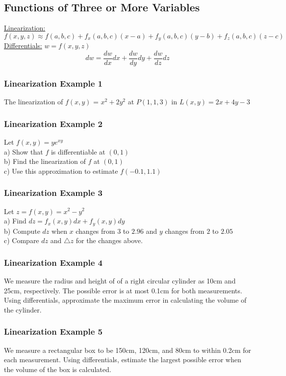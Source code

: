 \documentclass[12pt]{article}
\begin{document}
\subsection{Functions of Three or More Variables}
\underline{Linearization:}
\[
	f(x,y,z) \approx f(a,b,c) + f_x(a,b,c)(x-a) + f_y(a,b,c)(y-b) + f_z(a,b,c)(z-c)
\]
\underline{Differentials:} \(w=f(x,y,z)\) 
\[
	dw=\frac{dw}{dx}dx + \frac{dw}{dy}dy + \frac{dw}{dz}dz
\]
\subsubsection{Linearization Example 1}
The linearization of \(f(x,y)\) = \(x^2+2y^2\) at \(P(1,1,3)\) in \(L(x,y) = 2x+4y-3\) 

\subsubsection{Linearization Example 2}
Let \(f(x,y) = ye^{xy}\) \\
a) Show that \(f\) is differentiable at \((0,1)\) \\
b) Find the linearization of \(f\) at \((0,1)\) \\
c) Use this approximation to estimate \(f(-0.1,1.1)\) 

\subsubsection{Linearization Example 3}
Let \(z=f(x,y)=x^2-y^2\) \\
a) Find \(dz=f_x(x,y)dx+f_y(x,y)dy\)\\
b) Compute \(dz\) when \(x\) changes from \(3\) to \(2.96\) and \(y\) changes from \(2\) to \(2.05\) \\
c) Compare \(dz\) and \(\triangle z\) for the changes above.

\subsubsection{Linearization Example 4}
We measure the radius and height of of a right circular cylinder as 10cm and 25cm, respectively.
The possible error is at most 0.1cm for both measurements. Using differentials, approximate the maximum error in calculating the volume of the cylinder.

\subsubsection{Linearization Example 5}
We measure a rectangular box to be 150cm, 120cm, and 80cm to within 0.2cm for each measurement. Using differentials, estimate the largest possible error when the volume of the box is calculated.
\end{document}

